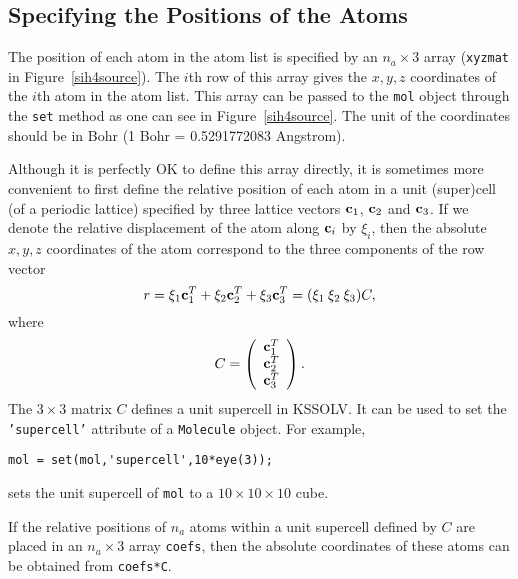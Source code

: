 \documentclass[11pt]{book}
\begin{document}
\subsection{Specifying the Positions of the Atoms}  
The position of each atom in the atom list is specified by an $n_a \times 3$
array ({\tt xyzmat} in Figure~\ref{sih4source}). The $i$th row of this array
gives the $x,y,z$ coordinates of the $i$th atom in the atom list.  
This array can be passed to the {\tt mol} object through the {\tt set} 
method as one can see in Figure~\ref{sih4source}.  The unit of the coordinates
should be in Bohr (1 Bohr = 0.5291772083 Angstrom).

Although it is perfectly OK to define this array directly, it is sometimes
more convenient to first define the relative position of each atom
in a unit (super)cell (of a periodic lattice) specified by three lattice 
vectors ${\bf c}_1$, ${\bf c}_2$ and ${\bf c}_3$. If we denote the relative 
displacement of the atom along ${\bf c}_i$ by $\xi_i$, then the 
absolute $x,y,z$ coordinates of the atom correspond to the
three components of the row vector
\[
r = \xi_1 {\bf c}_1^T +  \xi_2 {\bf c}_2^T +  \xi_3 {\bf c}_3^T
  = (\xi_1 \: \xi_2 \: \xi_3) C,
\]
where
\begin{equation}
C = \left(
\begin{array}{c}
{\bf c}_1^T \\
{\bf c}_2^T \\
{\bf c}_3^T \\
\end{array}
\right).
\label{unitcel}
\end{equation}
The $3 \times 3$ matrix $C$ defines a unit supercell in KSSOLV. It can
be used to set the {\tt 'supercell'} attribute of a {\tt Molecule}
object.  For example, 
\begin{verbatim}
mol = set(mol,'supercell',10*eye(3));
\end{verbatim}
sets the unit supercell of {\tt mol} to a $10 \times 10 \times 10$ cube. 

If the relative positions of $n_a$ atoms within a unit supercell
defined by $C$ are placed in an $n_a \times 3$ array {\tt coefs}, 
then the absolute coordinates of these atoms can be obtained from
{\tt coefs*C}.
\end{document}
